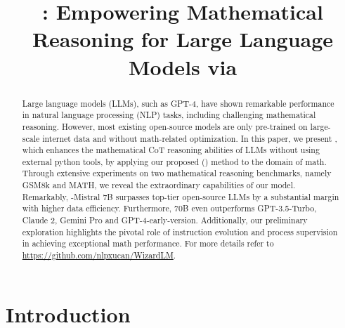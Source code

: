 \title{\modelname{}: Empowering Mathematical Reasoning for Large Language Models via \REIname{}}



\maketitle

\begin{abstract}

Large language models (LLMs), such as GPT-4, have shown remarkable performance in natural language processing (NLP) tasks, including challenging mathematical reasoning. However, most existing open-source models are only pre-trained on large-scale internet data and without math-related optimization. In this paper, we present \modelname{}, which enhances the mathematical CoT reasoning abilities of LLMs without using external python tools, by applying our proposed \REInameF{} (\textbf{\REInameS{}}) method to the domain of math. Through extensive experiments on two mathematical reasoning benchmarks, namely GSM8k and MATH, we reveal the extraordinary capabilities of our model. Remarkably, \modelname{}-Mistral 7B surpasses top-tier open-source LLMs by a substantial margin with higher data efficiency. Furthermore, \modelname{} 70B even outperforms GPT-3.5-Turbo, Claude 2, Gemini Pro and GPT-4-early-version. Additionally, our preliminary exploration highlights the pivotal role of instruction evolution and process supervision in achieving exceptional math performance.
For more details refer to \url{https://github.com/nlpxucan/WizardLM}.

\end{abstract}
\section{Introduction}

